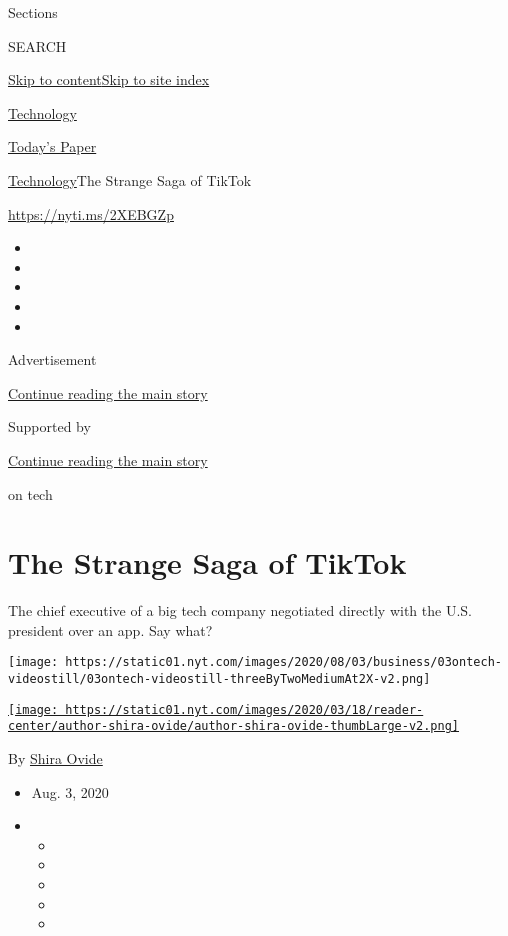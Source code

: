 Sections

SEARCH

\protect\hyperlink{site-content}{Skip to
content}\protect\hyperlink{site-index}{Skip to site index}

\href{https://www.nytimes.com/section/technology}{Technology}

\href{https://myaccount.nytimes.com/auth/login?response_type=cookie\&client_id=vi}{}

\href{https://www.nytimes.com/section/todayspaper}{Today's Paper}

\href{/section/technology}{Technology}\textbar{}The Strange Saga of
TikTok

\url{https://nyti.ms/2XEBGZp}

\begin{itemize}
\item
\item
\item
\item
\item
\end{itemize}

Advertisement

\protect\hyperlink{after-top}{Continue reading the main story}

Supported by

\protect\hyperlink{after-sponsor}{Continue reading the main story}

on tech

\hypertarget{the-strange-saga-of-tiktok}{%
\section{The Strange Saga of TikTok}\label{the-strange-saga-of-tiktok}}

The chief executive of a big tech company negotiated directly with the
U.S. president over an app. Say what?

\texttt{[image: https://static01.nyt.com/images/2020/08/03/business/03ontech-videostill/03ontech-videostill-threeByTwoMediumAt2X-v2.png]}

\href{https://www.nytimes.com/by/shira-ovide}{\texttt{[image: https://static01.nyt.com/images/2020/03/18/reader-center/author-shira-ovide/author-shira-ovide-thumbLarge-v2.png]}}

By \href{https://www.nytimes.com/by/shira-ovide}{Shira Ovide}

\begin{itemize}
\item
  Aug. 3, 2020
\item
  \begin{itemize}
  \item
  \item
  \item
  \item
  \item
  \end{itemize}
\end{itemize}

